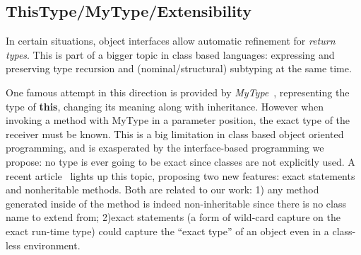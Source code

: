% 

\subsection{ThisType/MyType/Extensibility}

In certain situations, object interfaces allow automatic refinement for \emph{return
types}. This is part of a bigger topic in class based languages: expressing and
preserving type recursion and (nominal/structural) subtyping at the same time.

One famous attempt in this direction is provided by
\emph{MyType}~\cite{bruce1994paradigmatic}, representing the type of
\textbf{this}, changing its meaning along with inheritance. However when
invoking a method with MyType in a parameter position, the exact type of the
receiver must be known.  This is a big limitation in class based object oriented
programming, and is exasperated by the interface-based programming we propose: no
type is ever going to be exact since classes are not explicitly used. A recent
article~\cite{Saito2013933} lights up this topic, proposing two
new features: exact statements and nonheritable methods. Both are
related to our work: 1) any method generated inside of the \Q@of@ method is indeed
non-inheritable since there is no class name to extend from; 2)exact
statements (a form of wild-card capture on the exact run-time type) could
capture the ``exact type'' of an object even in a class-less environment.






